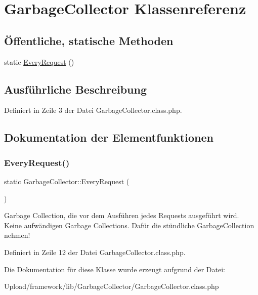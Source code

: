 \hypertarget{class_garbage_collector}{}\section{Garbage\+Collector Klassenreferenz}
\label{class_garbage_collector}
\subsection*{Öffentliche, statische Methoden}
\begin{DoxyCompactItemize}
\item 
static \mbox{\hyperlink{class_garbage_collector_aee0c4720f8c904c431da1f50d8dca9d4}{Every\+Request}} ()
\end{DoxyCompactItemize}


\subsection{Ausführliche Beschreibung}


Definiert in Zeile 3 der Datei Garbage\+Collector.\+class.\+php.



\subsection{Dokumentation der Elementfunktionen}
\mbox{\label{class_garbage_collector_aee0c4720f8c904c431da1f50d8dca9d4}} 
\subsubsection{\texorpdfstring{Every\+Request()}{EveryRequest()}}
{\footnotesize\ttfamily static Garbage\+Collector\+::\+Every\+Request (\begin{DoxyParamCaption}{ }\end{DoxyParamCaption})\hspace{0.3cm}{\ttfamily [static]}}

Garbage Collection, die vor dem Ausführen jedes Requests ausgeführt wird. Keine aufwändigen Garbage Collections. Dafür die stündliche Garbage\+Collection nehmen! 

Definiert in Zeile 12 der Datei Garbage\+Collector.\+class.\+php.



Die Dokumentation für diese Klasse wurde erzeugt aufgrund der Datei\+:\begin{DoxyCompactItemize}
\item 
Upload/framework/lib/\+Garbage\+Collector/Garbage\+Collector.\+class.\+php\end{DoxyCompactItemize}
